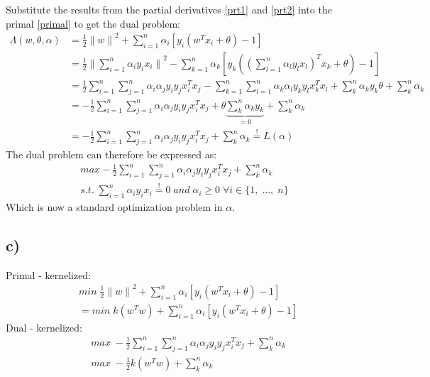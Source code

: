 \documentclass[12pt]{article}
\newcommand{\mysum}[2]{\sum_{#1 = 1}^{n}  #2}
\newcommand{\kersum}[1]{\sum_{#1 = 1}^{n}  \alpha_{#1} y_{#1} x_{#1}}
\newcommand{\dksum}[2]{\sum_{#1=1}^{n}  \sum_{#2=1}^{n}  
                                              \alpha_{#1}\alpha_{#2}
                                              y_{#1} y_{#2} 
                                              x_{#1}^{T} x_{#2}}
\begin{document}
Substitute the results from the partial derivatives \eqref{prt1} and \eqref{prt2} into the primal
\eqref{primal} to get the dual problem:
\begin{equation}
\label{dual_ini}
\begin{split}
\Lambda\left(w, \theta, \alpha\right) 
& =\frac{1}{2}{\lVert w\rVert}^2 + 
        \mysum{i}{\alpha_i \left[y_i\left(w^Tx_i + \theta\right) - 1\right]} \\
&= \frac{1}{2} {\lVert \kersum{i} \rVert}^2 
       - \mysum{k}{\alpha_k \left[y_k\left({\left(\kersum{l}\right)}^T x_k + \theta\right)-1 \right]} \\
&= \frac{1}{2} \dksum{i}{j} - \dksum{k}{l} + \sum_{k}^{n} \alpha_k y_k \theta 
      + \sum_{k}^{n} \alpha_k \\
&= -\frac{1}{2} \dksum{i}{j} + \theta \underbrace{\sum_k^n \alpha_k y_k}_{=0} 
      + \sum_{k}^{n} \alpha_k \\
&= - \frac{1}{2} \dksum{i}{j} + \sum_k^n \alpha_k \stackrel{!}{=} L\left(\alpha\right)
\end{split}
\end{equation}
The dual problem can therefore be expressed as:
\begin{equation}
\label{dual_proper}
\begin{split}
max  - \frac{1}{2} \dksum{i}{j} + \sum_k^n \alpha_k \\
s.t. \;  \kersum{i} \stackrel{!}{=} 0\; and \; \alpha_i \geq 0 \; \forall i \in \{1,\; ...,\; n\}
\end{split}
\end{equation}
Which is now a standard optimization problem in $\alpha$. 


\subsection*{c)}
Primal - kernelized:
\begin{equation}
\label{pri_ker}
\begin{split}
& min\;\frac{1}{2}{\lVert w\rVert}^2 + 
    \mysum{i}{\alpha_i \left[y_i\left(w^Tx_i + \theta\right) - 1\right]} \\
&= min \; k\left(w^Tw\right) + 
    \mysum{i}{\alpha_i \left[y_i\left(w^Tx_i + \theta\right) - 1\right]}
\end{split}
\end{equation}
Dual - kernelized:
\begin{equation}
\begin{split}
& max\; - \frac{1}{2} \dksum{i}{j} + \sum_k^n \alpha_k \\
& max\; - \frac{1}{2} k\left(w^Tw\right) + \sum_k^n \alpha_k
\end{split}
\end{equation}
\end{document}
